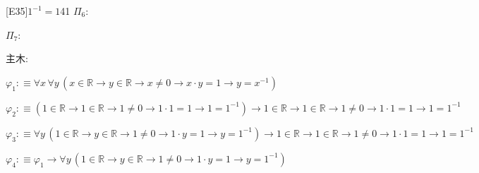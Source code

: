 \begin{fullproof}{[E35]}{$1^{-1} = 1$}{41}
\noindent$\Pi_{6}$:
\begin{ptree}
\noLine
{}
\noLine
{}
\end{ptree}
\noindent$\Pi_{7}$:
\begin{ptree}
\noLine
{}
\noLine
{}
\end{ptree}
\noindent 主木:
\begin{ptree}
\noLine
{}
\noLine
{}
\end{ptree}
\begin{abbrevlist}
\item $\varphi_{1} :\equiv \forall x\,\forall y\,(x \in \mathbb{R} \to y \in \mathbb{R} \to x \neq 0 \to x \cdot y = 1 \to y = x^{-1})$
\item $\varphi_{2} :\equiv (1 \in \mathbb{R} \to 1 \in \mathbb{R} \to 1 \neq 0 \to 1 \cdot 1 = 1 \to 1 = 1^{-1}) \to 1 \in \mathbb{R} \to 1 \in \mathbb{R} \to 1 \neq 0 \to 1 \cdot 1 = 1 \to 1 = 1^{-1}$
\item $\varphi_{3} :\equiv \forall y\,(1 \in \mathbb{R} \to y \in \mathbb{R} \to 1 \neq 0 \to 1 \cdot y = 1 \to y = 1^{-1}) \to 1 \in \mathbb{R} \to 1 \in \mathbb{R} \to 1 \neq 0 \to 1 \cdot 1 = 1 \to 1 = 1^{-1}$
\item $\varphi_{4} :\equiv \varphi_{1} \to \forall y\,(1 \in \mathbb{R} \to y \in \mathbb{R} \to 1 \neq 0 \to 1 \cdot y = 1 \to y = 1^{-1})$
\end{abbrevlist}
\end{fullproof}
